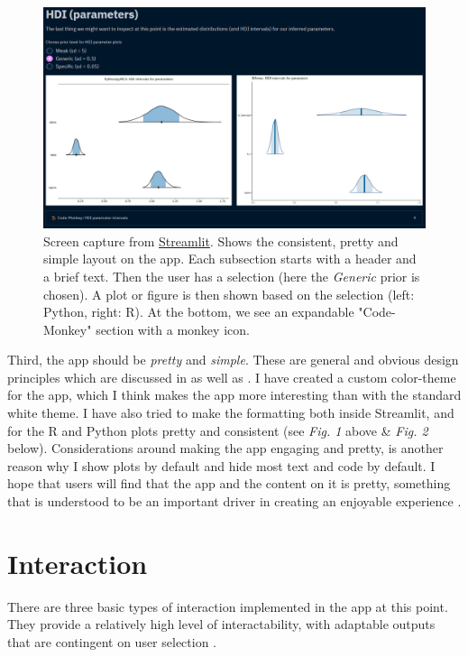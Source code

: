 \documentclass[12pt]{article}
\begin{document}
\begin{figure}[H]
    \centerline{\includegraphics[scale = 0.5]{../img/Pretty-Consistent.png}}
    \caption{Screen capture from
	    \href{https://share.streamlit.io/victor-m-p/bayesworkflow/main/BayesWorkflow.py}{Streamlit}.
    Shows the consistent, pretty and simple layout on the app.
    Each subsection starts with a header and a brief text.
    Then the user has a selection (here the \emph{Generic} prior is chosen).
    A plot or figure is then shown based on the selection (left: Python, right:
    R). At the bottom, we see an expandable "Code-Monkey" section with a monkey icon.
    }
\end{figure}


\vspace{5mm}

Third, the app should be \emph{pretty} and \emph{simple}. These are general
and obvious design principles which are discussed in
\textcite{tractinsky2000beautiful} as well as
\textcite[25-26]{hassenzahl2010experience}.
I have created a custom color-theme for the app, which I think makes the app more interesting
than with the standard white theme. I have also tried to make the formatting both inside
Streamlit, and for the R and Python plots pretty and consistent (see \emph{Fig.
1} above \& \emph{Fig. 2} below). Considerations around making
the app engaging
and pretty, is another reason why I show plots by default and hide most text and code by default.
I hope that users will find that the app and the content on it is pretty,
something that is understood to be an important driver
in creating an enjoyable experience \autocite[65]{hassenzahl2010experience}.

\section{Interaction}
There are three basic types of interaction implemented in the app
at this point. They provide a relatively high level of
interactability, with adaptable outputs that are contingent on
user selection \autocite{janlert2017meaning}.
\end{document}

